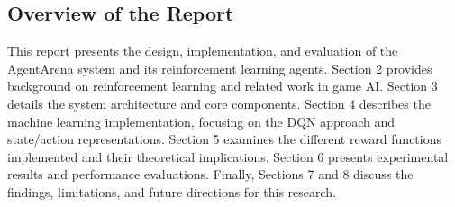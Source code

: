 \subsection{Overview of the Report}

This report presents the design, implementation, and evaluation of the AgentArena system and its reinforcement learning agents. Section 2 provides background on reinforcement learning and related work in game AI. Section 3 details the system architecture and core components. Section 4 describes the machine learning implementation, focusing on the DQN approach and state/action representations. Section 5 examines the different reward functions implemented and their theoretical implications. Section 6 presents experimental results and performance evaluations. Finally, Sections 7 and 8 discuss the findings, limitations, and future directions for this research.
